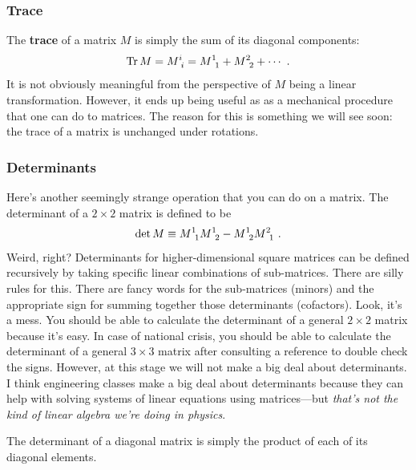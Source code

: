 \documentclass[12pt]{article}
\begin{document}
\subsubsection*{Trace}

The \textbf{trace} of a matrix $M$ is simply the sum of its diagonal components:
\begin{align}
    \Tr M = M\aij{i}{i} = M\aij{1}{1} + M\aij{2}{2} + \cdots \ .
\end{align}
It is not obviously meaningful from the perspective of $M$ being a linear transformation. However, it ends up being useful as as a mechanical procedure that one can do to matrices. The reason for this is something we will see soon: the trace of a matrix is unchanged under rotations. 

\subsubsection*{Determinants}

Here's another seemingly strange operation that you can do on a matrix. The determinant of a $2\times 2$ matrix is defined to be
\begin{align}
    \det M \equiv M\aij11 M\aij12 - M\aij12 M\aij21 \ .
\end{align}
Weird, right? Determinants for higher-dimensional square matrices can be defined recursively by taking specific linear combinations of sub-matrices. There are silly rules for this. There are fancy words for the sub-matrices (minors) and the appropriate sign for summing together those determinants (cofactors). Look, it's a mess. You should be able to calculate the determinant of a general $2\times 2$ matrix because it's easy. In case of national crisis, you should be able to calculate the determinant of a general $3\times 3$ matrix after consulting a reference to double check the signs. However, at this stage we will not make a big deal about determinants. I think engineering classes make a big deal about determinants because they can help with solving systems of linear equations using matrices---but \emph{that's not the kind of linear algebra we're doing in physics}.

\begin{example}\label{eg:determinant:of:diagonal}
The determinant of a diagonal matrix is simply the product of each of its diagonal elements. 
\end{example}
\end{document}
